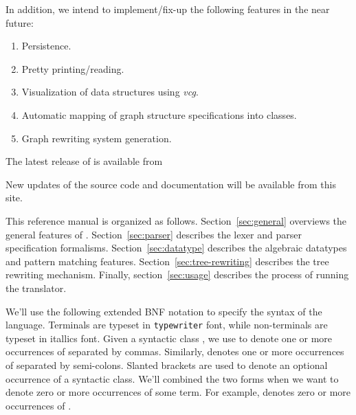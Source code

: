    In addition, we intend to implement/fix-up the following features in the 
near future:
\begin{enumerate}
   \item Persistence.
   \item Pretty printing/reading.
   \item Visualization of data structures using {\em vcg}\cite{vcg,vcg-manual}.
   \item Automatic mapping of graph structure specifications into
\Cpp{} classes.
   \item Graph rewriting system generation.
\end{enumerate}


   The latest release of \Prop{} \Version{} is available from
\begin{quotation}
\end{quotation}
New updates of the source code and documentation will be available
from this site.

   This reference manual is organized as follows.  Section~\ref{sec:general}
overviews the general features of \Prop.
Section~\ref{sec:parser}
describes the lexer and parser specification formalisms.
Section~\ref{sec:datatype} describes the algebraic datatypes and 
pattern matching features.  Section~\ref{sec:tree-rewriting} describes
the tree rewriting mechanism.  Finally, section~\ref{sec:usage} describes
the process of running the \Prop{} translator.

   We'll use the following extended BNF notation to specify the syntax
of the language.  Terminals are typeset in {\tt typewriter} font,
while non-terminals are typeset in {\nontermfont itallics} font.
Given a syntactic class , we use  to denote one
or more occurrences of  separated by commas.  Similarly,
 denotes one or more occurrences of  separated by
semi-colons.  Slanted brackets are used to denote an optional occurrence
of a syntactic class.   We'll combined the two forms when we
want to denote zero or more occurrences of some term.
For example,  denotes
zero or more occurrences of .

 \label{sec:general}


